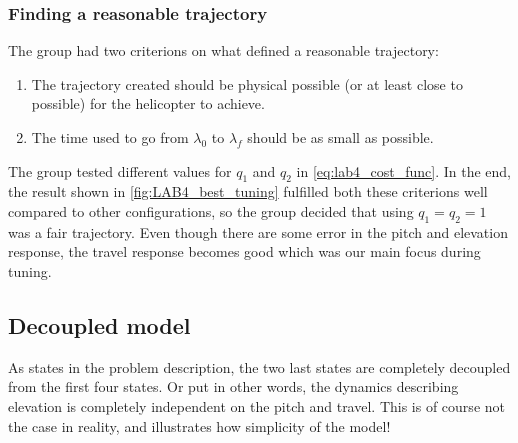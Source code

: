 \documentclass[../main.tex]{subfiles}
\begin{document}
\subsubsection{Finding a reasonable trajectory}
The group had two criterions on what defined a reasonable trajectory:
\begin{enumerate}
	\item The trajectory created should be physical possible (or at least close to possible) for the helicopter to achieve.
	\item The time used to go from $ \lambda_0 $ to $ \lambda_f $ should be as small as possible.
\end{enumerate}
The group tested different values for $ q_1 $ and $ q_2 $ in \cref{eq:lab4_cost_func}. In the end, the result shown in \cref{fig:LAB4_best_tuning} fulfilled both these criterions well compared to other configurations, so the group decided that using $ q_1 = q_2 = 1 $ was a fair trajectory. Even though there are some error in the pitch and elevation response, the travel response becomes good which was our main focus during tuning.

\subsection{Decoupled model} \label{sec:lab4_decoupled}
As states in the problem description, the two last states are completely decoupled from the first four states. Or put in other words, the dynamics describing elevation is completely independent on the pitch and travel. This is of course not the case in reality, and illustrates how simplicity of the model!
\end{document}

